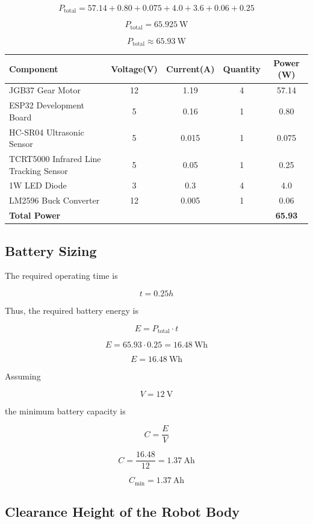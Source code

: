 \documentclass{article}
\begin{document}
\[
P_{\text{total}} =
57.14 + 0.80 + 0.075 + 4.0 + 3.6 + 0.06+0.25
\]

\[
P_{\text{total}} = 65.925\ \text{W}
\]

\[
\boxed{P_{\text{total}} \approx 65.93\ \text{W}}
\]

\begin{table}[h!]
\centering
\begin{tabular}{|l|c|c|c|c|}
\hline
\textbf{Component} & \textbf{Voltage(V)} & \textbf{Current(A)} & \textbf{Quantity} & \textbf{Power (W)} \\
\hline
JGB37 Gear Motor & 12 & 1.19 & 4 & 57.14 \\
ESP32 Development Board & 5 & 0.16 & 1 & 0.80 \\
HC-SR04 Ultrasonic Sensor & 5 & 0.015 & 1 & 0.075 \\
TCRT5000 Infrared Line Tracking Sensor & 5 & 0.05 & 1 & 0.25 \\
1W LED Diode & 3 & 0.3 & 4 & 4.0 \\
LM2596 Buck Converter & 12 & 0.005 & 1 & 0.06 \\
\hline
\textbf{Total Power} &  &  &  & \textbf{65.93} \\
\hline
\end{tabular}
\label{tab:power_consumption}
\end{table}

\subsection{Battery Sizing }

The required operating time is

\[
t = 0.25h
\]

Thus, the required battery energy is

\[
E = P_{\text{total}} \cdot t
\]

\[
E = 65.93 \cdot 0.25 = 16.48\ \text{Wh}
\]

\[
\boxed{E=16.48\ \text{Wh}}
\]

Assuming

\[
V = 12\ \text{V}
\]

the minimum battery capacity is

\[
C = \frac{E}{V}
\]

\[
C = \frac{16.48}{12} = 1.37\ \text{Ah}
\]

\[
\boxed{C_{\min} = 1.37\ \text{Ah}}
\]
\subsection{Clearance Height of the Robot Body}
\end{document}
